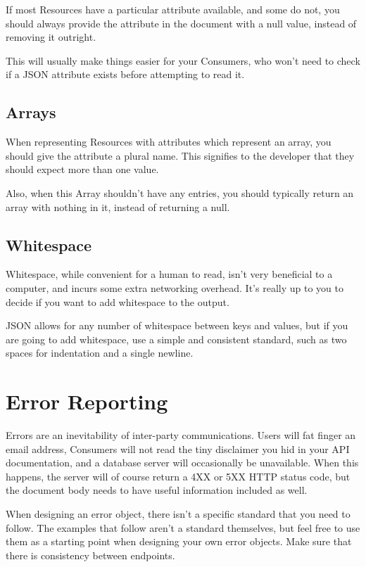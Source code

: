 \documentclass{book}
\begin{document}
If most Resources have a particular attribute available, and some do not, you should always provide the attribute in the document with a null value, instead of removing it outright.

This will usually make things easier for your Consumers, who won't need to check if a JSON attribute exists before attempting to read it.

\subsection{Arrays}

When representing Resources with attributes which represent an array, you should give the attribute a plural name. This signifies to the developer that they should expect more than one value.

Also, when this Array shouldn't have any entries, you should typically return an array with nothing in it, instead of returning a null.

\subsection{Whitespace}

Whitespace, while convenient for a human to read, isn't very beneficial to a computer, and incurs some extra networking overhead. It's really up to you to decide if you want to add whitespace to the output.

JSON allows for any number of whitespace between keys and values, but if you are going to add whitespace, use a simple and consistent standard, such as two spaces for indentation and a single newline.

\section{Error Reporting}

Errors are an inevitability of inter-party communications. Users will fat finger an email address, Consumers will not read the tiny disclaimer you hid in your API documentation, and a database server will occasionally be unavailable. When this happens, the server will of course return a 4XX or 5XX HTTP status code, but the document body needs to have useful information included as well.

When designing an error object, there isn't a specific standard that you need to follow. The examples that follow aren't a standard themselves, but feel free to use them as a starting point when designing your own error objects. Make sure that there is consistency between endpoints.
\end{document}
